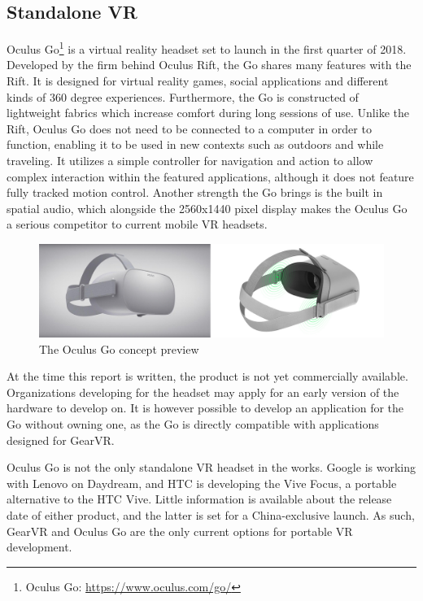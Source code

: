	  	\subsection{Standalone VR}\label{sec:standaloneVR}
	  	Oculus Go\footnote{Oculus Go: \url{https://www.oculus.com/go/}} is a virtual reality headset set to launch in the first quarter of 2018. Developed by the firm behind Oculus Rift, the Go shares many features with the Rift. It is designed for virtual reality games, social applications and different kinds of 360 degree experiences. Furthermore, the Go is constructed of lightweight fabrics which increase comfort during long sessions of use. Unlike the Rift, Oculus Go does not need to be connected to a computer in order to function, enabling it to be used in new contexts such as outdoors and while traveling. It utilizes a simple controller for navigation and action to allow complex interaction within the featured applications, although it does not feature fully tracked motion control. Another strength the Go brings is the built in spatial audio, which alongside the 2560x1440 pixel display makes the Oculus Go a serious competitor to current mobile VR headsets.  \\
	  	\begin{figure}[H]
	  		\centering
	  		\includegraphics[width=1.0\linewidth]{figure/Analysis/oculusgo}
	  		\caption{The Oculus Go concept preview}
	  		\label{fig:Oculus}
	  	\end{figure}
	  	
	  	At the time this report is written, the product is not yet commercially available. Organizations developing for the headset may apply for an early version of the hardware to develop on. It is however possible to develop an application for the Go without owning one, as the Go is directly compatible with applications designed for GearVR. 
	  	
	  	Oculus Go is not the only standalone VR headset in the works. Google is working with Lenovo on Daydream, and HTC is developing the Vive Focus, a portable alternative to the HTC Vive. Little information is available about the release date of either product, and the latter is set for a China-exclusive launch. As such, GearVR and Oculus Go are the only current options for portable VR development.
	  
